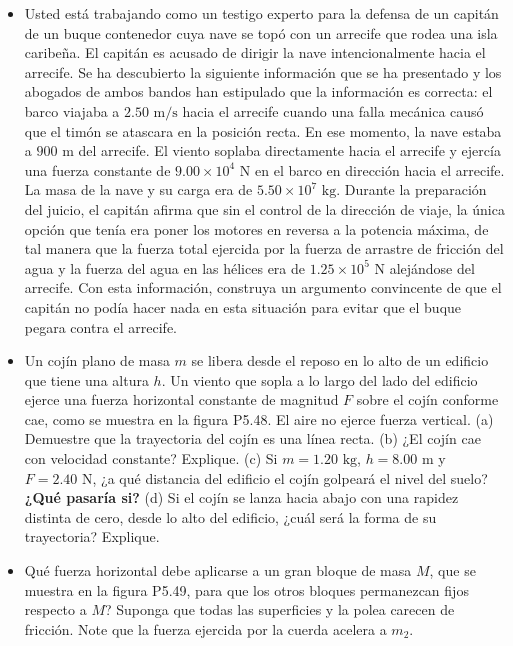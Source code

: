 \documentclass[11pt,a4paper]{article}
\begin{document}
\begin{itemize}
    \item[\textbf{47.}] Usted está trabajando como un testigo experto para la defensa de un capitán de un buque contenedor cuya nave se topó con un arrecife que rodea una isla caribeña. El capitán es acusado de dirigir la nave intencionalmente hacia el arrecife. Se ha descubierto la siguiente información que se ha presentado y los abogados de ambos bandos han estipulado que la información es correcta: el barco viajaba a $2.50 \text{ m/s}$ hacia el arrecife cuando una falla mecánica causó que el timón se atascara en la posición recta. En ese momento, la nave estaba a $900 \text{ m}$ del arrecife. El viento soplaba directamente hacia el arrecife y ejercía una fuerza constante de $9.00 \times 10^4 \text{ N}$ en el barco en dirección hacia el arrecife. La masa de la nave y su carga era de $5.50 \times 10^7 \text{ kg}$. Durante la preparación del juicio, el capitán afirma que sin el control de la dirección de viaje, la única opción que tenía era poner los motores en reversa a la potencia máxima, de tal manera que la fuerza total ejercida por la fuerza de arrastre de fricción del agua y la fuerza del agua en las hélices era de $1.25 \times 10^5 \text{ N}$ alejándose del arrecife. Con esta información, construya un argumento convincente de que el capitán no podía hacer nada en esta situación para evitar que el buque pegara contra el arrecife.
    \vspace*{7cm}

    \item[\textbf{48.}] Un cojín plano de masa $m$ se libera desde el reposo en lo alto de un edificio que tiene una altura $h$. Un viento que sopla a lo largo del lado del edificio ejerce una fuerza horizontal constante de magnitud $F$ sobre el cojín conforme cae, como se muestra en la figura P5.48. El aire no ejerce fuerza vertical. (a) Demuestre que la trayectoria del cojín es una línea recta. (b) ¿El cojín cae con velocidad constante? Explique. (c) Si $m = 1.20 \text{ kg}$, $h = 8.00 \text{ m}$ y $F = 2.40 \text{ N}$, ¿a qué distancia del edificio el cojín golpeará el nivel del suelo? \textbf{¿Qué pasaría si?} (d) Si el cojín se lanza hacia abajo con una rapidez distinta de cero, desde lo alto del edificio, ¿cuál será la forma de su trayectoria? Explique.
    \vspace*{8cm}

    \item[\textbf{49.}] Qué fuerza horizontal debe aplicarse a un gran bloque de masa $M$, que se muestra en la figura P5.49, para que los otros bloques permanezcan fijos respecto a $M$? Suponga que todas las superficies y la polea carecen de fricción. Note que la fuerza ejercida por la cuerda acelera a $m_2$.
    \vspace*{6cm}


\end{itemize}
\end{document}
